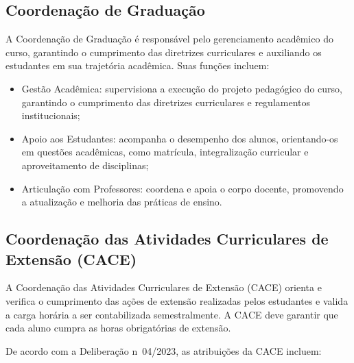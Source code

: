 \subsection{Coordenação de Graduação}

A Coordenação de Graduação é responsável pelo gerenciamento acadêmico do curso, garantindo o cumprimento das diretrizes curriculares e auxiliando os estudantes em sua trajetória acadêmica. Suas funções incluem:

\begin{itemize}
    \item Gestão Acadêmica: supervisiona a execução do projeto pedagógico do curso, garantindo o cumprimento das diretrizes curriculares e regulamentos institucionais;
    \item Apoio aos Estudantes: acompanha o desempenho dos alunos, orientando-os em questões acadêmicas, como matrícula, integralização curricular e aproveitamento de disciplinas;
    \item Articulação com Professores: coordena e apoia o corpo docente, promovendo a atualização e melhoria das práticas de ensino.

\end{itemize}

\subsection{Coordenação das Atividades Curriculares de Extensão (CACE)}

A Coordenação das Atividades Curriculares de Extensão (CACE) orienta e verifica o cumprimento das ações de extensão realizadas pelos estudantes e valida a carga horária a ser contabilizada semestralmente. A CACE deve garantir que cada aluno cumpra as horas obrigatórias de extensão.

De acordo com a Deliberação n\textordmasculine~04/2023, as atribuições da CACE incluem:

